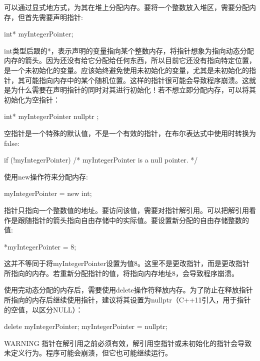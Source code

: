 
可以通过显式地方式，为其在堆上分配内存。要将一个整数放入堆区，需要分配内存，但首先需要声明指针:

\begin{cpp}
int* myIntegerPointer;
\end{cpp}

int类型后跟的*，表示声明的变量指向某个整数内存，将指针想象为指向动态分配内存的箭头。因为还没有给它分配给任何东西，所以目前它还没有指向特定位置，是一个未初始化的变量。应该始终避免使用未初始化的变量，尤其是未初始化的指针，其可能指向内存中的某个随机位置。这样的指针很可能会导致程序崩溃。这就是为什么需要在声明指针的同时对其进行初始化！若不想立即分配内存，可以将其初始化为空指针：

\begin{cpp}
int* myIntegerPointer { nullptr };
\end{cpp}

空指针是一个特殊的默认值，不是一个有效的指针，在布尔表达式中使用时转换为false:

\begin{cpp}
if (!myIntegerPointer) { /* myIntegerPointer is a null pointer. */ }
\end{cpp}

使用new操作符来分配内存:

\begin{cpp}
myIntegerPointer = new int;
\end{cpp}

指针只指向一个整数值的地址。要访问该值，需要对指针解引用。可以把解引用看作是跟随指针的箭头指向自由存储中的实际值。要设置新分配的自由存储整数的值:

\begin{cpp}
*myIntegerPointer = 8;
\end{cpp}

这并不等同于将myIntegerPointer设置为值8。这里不是更改指针，而是更改指针所指向的内存。若重新分配指针的值，将指向内存地址8，会导致程序崩溃。

使用完动态分配的内存后，需要使用delete操作符释放内存。为了防止在释放指针所指向的内存后继续使用指针，建议将其设置为nullptr（C++11引入，用于指针的空值，以区分NULL）：

\begin{cpp}
delete myIntegerPointer;
myIntegerPointer = nullptr;
\end{cpp}

\begin{myWarning}{WARNING}
指针在解引用之前必须有效，解引用空指针或未初始化的指针会导致未定义行为。程序可能会崩溃，但它也可能继续运行。
\end{myWarning}


